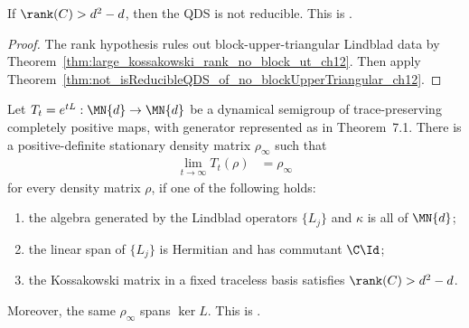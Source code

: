 \begin{theorem}
    \label{thm:not_isReducible_of_kossakowski_rank_ge}
    \leanok
    If $\rank(C)>d^2-d$, then the QDS is not reducible.
    This is \cite[Corollary~7.2(3)]{Wolf2012Quantum}.
\end{theorem}

\begin{proof}\leanok
    The rank hypothesis rules out block-upper-triangular Lindblad data by
    Theorem~\ref{thm:large_kossakowski_rank_no_block_ut_ch12}. Then apply
    Theorem~\ref{thm:not_isReducibleQDS_of_no_blockUpperTriangular_ch12}.
\end{proof}

\begin{theorem}
    \label{thm:wolf_corollary_7_2}
    \leanok
    Let $T_t=e^{tL}:\MN{d}\to\MN{d}$ be a dynamical semigroup of
    trace-preserving completely positive maps, with generator represented as
    in Theorem~7.1.  There is a positive-definite stationary density matrix
    $\rho_\infty$ such that
    \begin{align}
        \lim_{t\to\infty}T_t(\rho)&=\rho_\infty
    \end{align}
    for every density matrix $\rho$, if one of the following holds:
    \begin{enumerate}
        \item the algebra generated by the Lindblad operators $\{L_j\}$ and
              $\kappa$ is all of $\MN{d}$;
        \item the linear span of $\{L_j\}$ is Hermitian and has commutant
              $\C\Id$;
        \item the Kossakowski matrix in a fixed traceless basis satisfies
              $\rank(C)>d^2-d$.
    \end{enumerate}
    Moreover, the same $\rho_\infty$ spans $\ker L$.
    This is \cite[Corollary~7.2]{Wolf2012Quantum}.
\end{theorem}

